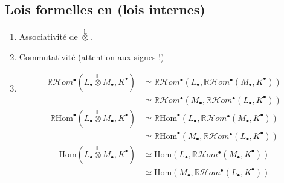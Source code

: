 \documentclass[11pt,a4paper]{article}
\begin{document}
\subsection{Lois formelles en \ill{} \ill{} (lois internes)}

\begin{enumerate}
  \item Associativité de $\overset{\mathbb{L}}{\otimes}$.
  \item Commutativité (attention aux signes !)
  \item \begin{align*}
      \mathbb{R}\mathcal{H}om^{\bullet}(L_{\bullet} \overset{\mathbb{L}}{\otimes} M_{\bullet}, K^{\bullet})
        &\simeq \mathbb{R}\mathcal{H}om^{\bullet}(L_{\bullet}, \mathbb{R}\mathcal{H}om^{\bullet}(M_{\bullet}, K^{\bullet})) \\
        &\simeq \mathbb{R}\mathcal{H}om^{\bullet}(M_{\bullet}, \mathbb{R}\mathcal{H}om^{\bullet}(L_{\bullet}, K^{\bullet}))
    \end{align*}
    \begin{align*}
      \mathbb{R}\mathrm{Hom}^{\bullet}(L_{\bullet} \overset{\mathbb{L}}{\otimes} M_{\bullet}, K^{\bullet})
        &\simeq \mathbb{R}\mathrm{Hom}^{\bullet}(L_{\bullet}, \mathbb{R}\mathcal{H}om^{\bullet}(M_{\bullet}, K^{\bullet})) \\
        &\simeq \mathbb{R}\mathrm{Hom}^{\bullet}(M_{\bullet}, \mathbb{R}\mathcal{H}om^{\bullet}(L_{\bullet}, K^{\bullet}))
    \end{align*}
    \begin{align*}
      \mathrm{Hom}(L_{\bullet} \overset{\mathbb{L}}{\otimes} M_{\bullet}, K^{\bullet})
        &\simeq \mathrm{Hom}(L_{\bullet}, \mathbb{R}\mathcal{H}om^{\bullet}(M_{\bullet}, K^{\bullet})) \\
        &\simeq \mathrm{Hom}(M_{\bullet}, \mathbb{R}\mathcal{H}om^{\bullet}(L_{\bullet}, K^{\bullet}))
    \end{align*}
\end{enumerate}
\end{document}

